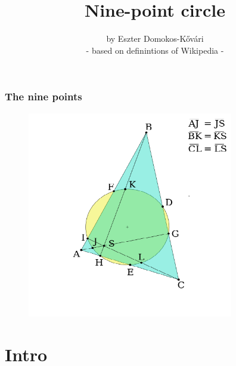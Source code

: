 \documentclass{beamer}
\begin{document}
\author{by Eszter Domokos-Kővári  \\  \tiny   - based on definintions of Wikipedia -}
	
\title{Nine-point circle} 

\setlength{\parindent}{1em}



    \begin{frame}
    \maketitle
    \end{frame}



    \begin{frame}

	\frametitle{The nine points}

	\begin{figure}

		\includegraphics[angle=40, width=9cm]{9points.png}

	\end{figure}

    	\vspace{2 cm}

    \end{frame}

\section{Intro}
\end{document}
